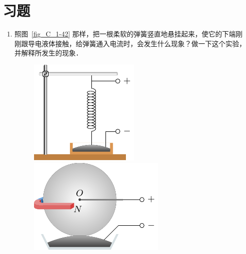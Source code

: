 \section*{习题}
\begin{enumerate}
    \item 照图~\ref{fig_C_1-42} 那样，把一根柔软的弹簧竖直地悬挂起来，使它的下端刚刚跟导电液体接触，给弹簧通入电流时，会发生什么现象？做一下这个实验，并解释所发生的现象．

\begin{figure}[htbp]
    \centering
    \begin{minipage}[t]{0.48\textwidth}
        \centering
        \includegraphics{fig/C/1-42.pdf}
        \caption{}\label{fig_C_1-42}
    \end{minipage}
    \begin{minipage}[t]{0.48\textwidth}
        \centering
        \includegraphics{fig/C/1-43.pdf}
        \caption{}\label{fig_C_1-43}
    \end{minipage}
\end{figure}


\end{enumerate}
